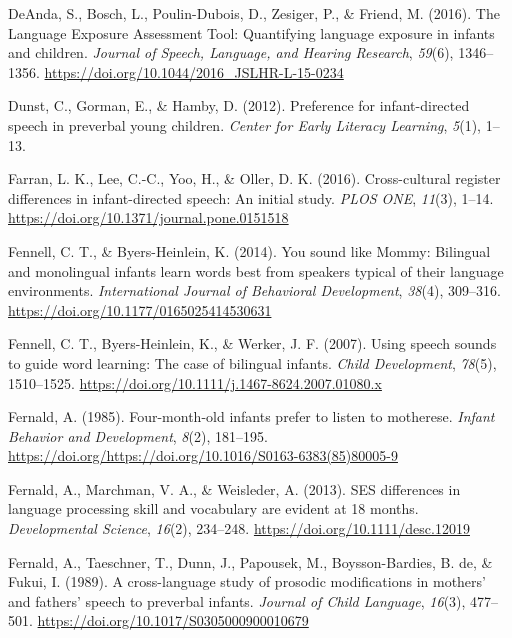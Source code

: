 \documentclass[english,,man,floatsintext]{apa6}
\begin{document}
\leavevmode\hypertarget{ref-deanda_2016}{}%
DeAnda, S., Bosch, L., Poulin-Dubois, D., Zesiger, P., \& Friend, M. (2016). The Language Exposure Assessment Tool: Quantifying language exposure in infants and children. \emph{Journal of Speech, Language, and Hearing Research}, \emph{59}(6), 1346--1356. \url{https://doi.org/10.1044/2016_JSLHR-L-15-0234}

\leavevmode\hypertarget{ref-dunst_2012}{}%
Dunst, C., Gorman, E., \& Hamby, D. (2012). Preference for infant-directed speech in preverbal young children. \emph{Center for Early Literacy Learning}, \emph{5}(1), 1--13.

\leavevmode\hypertarget{ref-farran_2016}{}%
Farran, L. K., Lee, C.-C., Yoo, H., \& Oller, D. K. (2016). Cross-cultural register differences in infant-directed speech: An initial study. \emph{PLOS ONE}, \emph{11}(3), 1--14. \url{https://doi.org/10.1371/journal.pone.0151518}

\leavevmode\hypertarget{ref-fennell_2014}{}%
Fennell, C. T., \& Byers-Heinlein, K. (2014). You sound like Mommy: Bilingual and monolingual infants learn words best from speakers typical of their language environments. \emph{International Journal of Behavioral Development}, \emph{38}(4), 309--316. \url{https://doi.org/10.1177/0165025414530631}

\leavevmode\hypertarget{ref-fennell_2007}{}%
Fennell, C. T., Byers-Heinlein, K., \& Werker, J. F. (2007). Using speech sounds to guide word learning: The case of bilingual infants. \emph{Child Development}, \emph{78}(5), 1510--1525. \url{https://doi.org/10.1111/j.1467-8624.2007.01080.x}

\leavevmode\hypertarget{ref-fernald_1985}{}%
Fernald, A. (1985). Four-month-old infants prefer to listen to motherese. \emph{Infant Behavior and Development}, \emph{8}(2), 181--195. \url{https://doi.org/https://doi.org/10.1016/S0163-6383(85)80005-9}

\leavevmode\hypertarget{ref-fernald_2013}{}%
Fernald, A., Marchman, V. A., \& Weisleder, A. (2013). SES differences in language processing skill and vocabulary are evident at 18 months. \emph{Developmental Science}, \emph{16}(2), 234--248. \url{https://doi.org/10.1111/desc.12019}

\leavevmode\hypertarget{ref-fernald_1989}{}%
Fernald, A., Taeschner, T., Dunn, J., Papousek, M., Boysson-Bardies, B. de, \& Fukui, I. (1989). A cross-language study of prosodic modifications in mothers' and fathers' speech to preverbal infants. \emph{Journal of Child Language}, \emph{16}(3), 477--501. \url{https://doi.org/10.1017/S0305000900010679}
\end{document}
